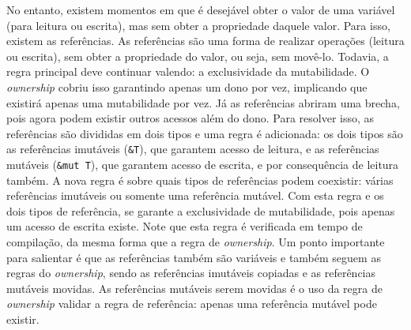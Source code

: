 No entanto, existem momentos em que é desejável obter o valor de uma variável (para leitura ou escrita), mas sem obter a propriedade daquele valor. Para isso, existem as referências. As referências são uma forma de realizar operações (leitura ou escrita), sem obter a propriedade do valor, ou seja, sem movê-lo. Todavia, a regra principal deve continuar valendo: a exclusividade da mutabilidade. O \textit{ownership} cobriu isso garantindo apenas um dono por vez, implicando que existirá apenas uma mutabilidade por vez. Já as referências abriram uma brecha, pois agora podem existir outros acessos além do dono. Para resolver isso, as referências são divididas em dois tipos e uma regra é adicionada: os dois tipos são as referências imutáveis (\texttt{\&T}), que garantem acesso de leitura, e as referências mutáveis (\texttt{\&mut T}), que garantem acesso de escrita, e por consequência de leitura também. A nova regra é sobre quais tipos de referências podem coexistir: várias referências imutáveis ou somente uma referência mutável. Com esta regra e os dois tipos de referência, se garante a exclusividade de mutabilidade, pois apenas um acesso de escrita existe. Note que esta regra é verificada em tempo de compilação, da mesma forma que a regra de \textit{ownership}. Um ponto importante para salientar é que as referências também são variáveis e também seguem as regras do \textit{ownership}, sendo as referências imutáveis copiadas e as referências mutáveis movidas. As referências mutáveis serem movidas é o uso da regra de \textit{ownership} validar a regra de referência: apenas uma referência mutável pode existir.

